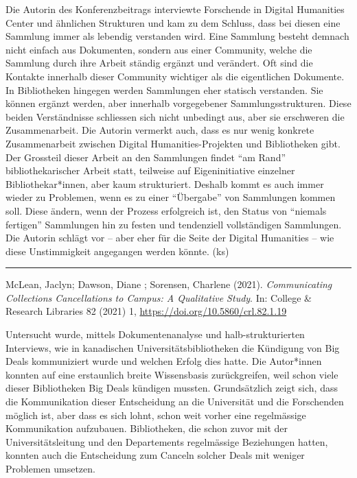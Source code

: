 \documentclass[a4paper,
fontsize=11pt,
oneside,
numbers=noperiodatend,
parskip=half-,
bibliography=totoc,
final
]{scrartcl}
\begin{document}
Die Autorin des Konferenzbeitrags interviewte Forschende in Digital
Humanities Center und ähnlichen Strukturen und kam zu dem Schluss, dass
bei diesen eine Sammlung immer als lebendig verstanden wird. Eine
Sammlung besteht demnach nicht einfach aus Dokumenten, sondern aus einer
Community, welche die Sammlung durch ihre Arbeit ständig ergänzt und
verändert. Oft sind die Kontakte innerhalb dieser Community wichtiger
als die eigentlichen Dokumente. In Bibliotheken hingegen werden
Sammlungen eher statisch verstanden. Sie können ergänzt werden, aber
innerhalb vorgegebener Sammlungsstrukturen. Diese beiden Verständnisse
schliessen sich nicht unbedingt aus, aber sie erschweren die
Zusammenarbeit. Die Autorin vermerkt auch, dass es nur wenig konkrete
Zusammenarbeit zwischen Digital Humanities-Projekten und Bibliotheken
gibt. Der Grossteil dieser Arbeit an den Sammlungen findet \enquote{am
Rand} bibliothekarischer Arbeit statt, teilweise auf Eigeninitiative
einzelner Bibliothekar*innen, aber kaum strukturiert. Deshalb kommt es
auch immer wieder zu Problemen, wenn es zu einer \enquote{Übergabe} von
Sammlungen kommen soll. Diese ändern, wenn der Prozess erfolgreich ist,
den Status von \enquote{niemals fertigen} Sammlungen hin zu festen und
tendenziell vollständigen Sammlungen. Die Autorin schlägt vor -- aber
eher für die Seite der Digital Humanities -- wie diese Unstimmigkeit
angegangen werden könnte. (ks)

\begin{center}\rule{0.5\linewidth}{0.5pt}\end{center}

McLean, Jaclyn; Dawson, Diane ; Sorensen, Charlene (2021).
\emph{Communicating Collections Cancellations to Campus: A Qualitative
Study}. In: College \& Research Libraries 82 (2021) 1,
\url{https://doi.org/10.5860/crl.82.1.19}

Untersucht wurde, mittels Dokumentenanalyse und halb-strukturierten
Interviews, wie in kanadischen Universitätsbibliotheken die Kündigung
von Big Deals kommuniziert wurde und welchen Erfolg dies hatte. Die
Autor*innen konnten auf eine erstaunlich breite Wissensbasis
zurückgreifen, weil schon viele dieser Bibliotheken Big Deals kündigen
mussten. Grundsätzlich zeigt sich, dass die Kommunikation dieser
Entscheidung an die Universität und die Forschenden möglich ist, aber
dass es sich lohnt, schon weit vorher eine regelmässige Kommunikation
aufzubauen. Bibliotheken, die schon zuvor mit der Universitätsleitung
und den Departements regelmässige Beziehungen hatten, konnten auch die
Entscheidung zum Canceln solcher Deals mit weniger Problemen umsetzen.
\end{document}
